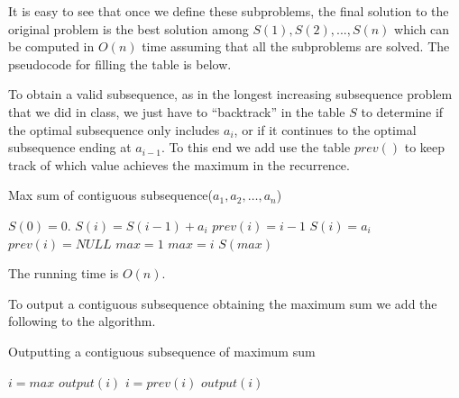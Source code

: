 \documentclass[12pt]{article}
\begin{document}
It is easy to see that once we define these subproblems, the final solution to the original problem is the best solution among $S(1), S(2),..., S(n)$ which can be computed in $O(n)$ time assuming that all the subproblems are solved.
The pseudocode for filling the table is below.

To obtain a valid subsequence, as in the longest increasing subsequence problem
that we did in class, we just have to ``backtrack'' in the table $S$ to determine if the
optimal subsequence only includes $a_i$, or if it continues to the optimal subsequence ending at $a_{i-1}$.
To this end we add use the table $prev()$ to keep track of which value achieves
the maximum in the recurrence.

\begin{algorithm}[h!]
\caption{Max sum of contiguous subsequence($a_1,a_2,\dots,a_n$)}
\begin{algorithmic}
\STATE $S(0) = 0$.
\STATE $S(i) = S(i-1)+a_i$
\STATE $prev(i) = i-1$
\ELSE
\STATE $S(i) = a_i$
\STATE $prev(i) = NULL$
\ENDIF
\ENDFOR
\STATE $max=1$
\STATE $max=i$
\ENDIF
\ENDFOR
\RETURN $S(max)$
\end{algorithmic}
\end{algorithm}


The running time is $O(n)$.

To output a contiguous subsequence obtaining the maximum sum we add
the following to the algorithm.

\begin{algorithm}[h!]
\caption{Outputting a contiguous subsequence of maximum sum}
\begin{algorithmic}
\STATE $i=max$
\STATE $output(i)$
\STATE $i = prev(i)$
\STATE  $output(i)$
  \ENDWHILE
\end{algorithmic}
\end{algorithm}
\end{document}

